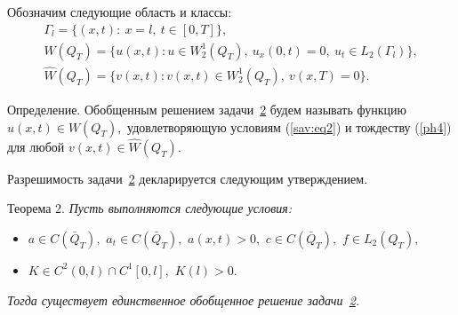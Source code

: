 Обозначим следующие область и классы:
\begin{gather*}
\Gamma_l=\{(x,t): \ x=l, \ t\in [0,T]\},
\\
W(Q_T)=\{u (x,t): u\in W_2^1(Q_T), \  u_x(0,t)=0, \ u_t\in L_2(\Gamma_l)\},
\\
\hat{W}(Q_T)=\{v(x,t): v(x,t)\in W_2^1(Q_T), \  v(x,T)=0\}.
\end{gather*}

\smallskip

{\small\sc Определение.} Обобщенным решением задачи~\hyperlink{sav:task2}{2} будем называть функцию  $u(x,t)\in W(Q_T),$
удовлетворяющую условиям (\ref{sav:eq2}) и тождеству (\ref{ph4}) для любой  $v(x, t)\in \hat{W}(Q_T).$

\smallskip

Разрешимость задачи~\hyperlink{sav:task2}{2} декларируется следующим утверждением.

\smallskip
\hypertarget{sav:th2}{}
{\small\sc Теорема 2.} \it Пусть выполняются следующие условия\rm:
\begin{itemize}
\item[\rm(i)] $a\in C(\bar{Q}_T),$ $ a_t\in C(\bar{Q}_T),$ $ a(x,t)>0,$  $ c\in C(\bar{Q}_T),$ $ f\in L_2(Q_T),$
\item[\rm(ii)]  $K\in C^2(0, l)\cap C^1[0,l],$ $K(l)>0.$
\end{itemize}
\it Тогда существует единственное обобщенное решение  задачи\rm~\hyperlink{sav:task2}{2}.

\smallskip

